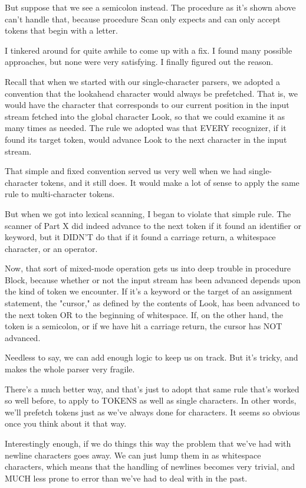 \documentclass[float=false, crop=false]{standalone}
\begin{document}
But suppose that we see a semicolon instead. The procedure as it's shown above
can't handle that, because procedure Scan only expects and can only accept
tokens that begin with a letter.

I tinkered around for quite awhile to come up with a fix. I found many possible
approaches, but none were very satisfying. I finally figured out the reason.

Recall that when we started with our single-character parsers, we adopted a
convention that the lookahead character would always be prefetched. That is, we
would have the character that corresponds to our current position in the input
stream fetched into the global character Look, so that we could examine it as
many times as needed. The rule we adopted was that EVERY recognizer, if it found
its target token, would advance Look to the next character in the input stream.

That simple and fixed convention served us very well when we had
single-character tokens, and it still does. It would make a lot of sense to
apply the same rule to multi-character tokens.

But when we got into lexical scanning, I began to violate that simple rule. The
scanner of Part X did indeed advance to the next token if it found an identifier
or keyword, but it DIDN'T do that if it found a carriage return, a whitespace
character, or an operator.

Now, that sort of mixed-mode operation gets us into deep trouble in procedure
Block, because whether or not the input stream has been advanced depends upon
the kind of token we encounter. If it's a keyword or the target of an assignment
statement, the "cursor," as defined by the contents of Look, has been advanced
to the next token OR to the beginning of whitespace. If, on the other hand, the
token is a semicolon, or if we have hit a carriage return, the cursor has NOT
advanced.

Needless to say, we can add enough logic to keep us on track. But it's tricky,
and makes the whole parser very fragile.

There's a much better way, and that's just to adopt that same rule that's worked
so well before, to apply to TOKENS as well as single characters. In other words,
we'll prefetch tokens just as we've always done for characters. It seems so
obvious once you think about it that way.

Interestingly enough, if we do things this way the problem that we've had with
newline characters goes away. We can just lump them in as whitespace characters,
which means that the handling of newlines becomes very trivial, and MUCH less
prone to error than we've had to deal with in the past.
\end{document}
